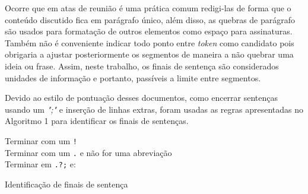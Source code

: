 	Ocorre que em atas de reunião é uma prática comum redigi-las de forma que o conteúdo discutido fica em parágrafo único, além disso, as quebras de parágrafo são usados para formatação de outros elementos como espaço para assinaturas. 
%
	Também não é conveniente indicar todo ponto entre \textit{token} como candidato pois obrigaria a ajustar posteriormente os segmentos de maneira a não quebrar uma ideia ou frase. 
%	
	Assim, neste trabalho, os finais de sentença são considerados unidades de informação e portanto, passíveis a limite entre segmentos. 
	
	Devido ao estilo de pontuação desses documentos, como encerrar sentenças usando um \textit{";"} e inserção de linhas extras, foram usadas as regras apresentadas no Algoritmo 1 para identificar os finais de sentenças.  


\begin{algorithm}

	
	
	 {	

	Terminar com um \texttt{!}\\
	Terminar com um \texttt{.} e não for uma abreviação\\
	Terminar em \texttt{.?;} e:
	}
	
	\caption{Identificação de finais de sentença}
	\label{alg:identificacaofinaisdesent}
\end{algorithm}





%	

